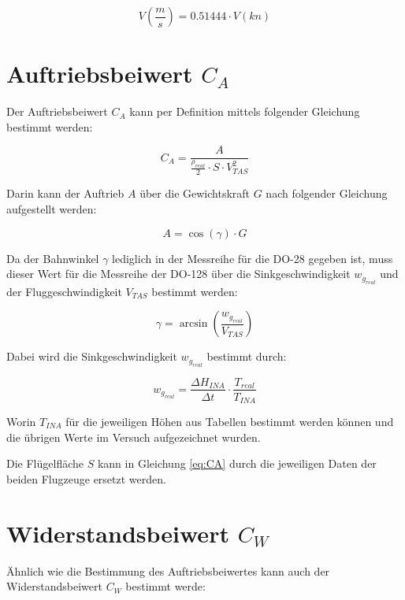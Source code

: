 \begin{equation}
V\left(\frac{m}{s}\right)=0.51444 \cdot V\left(kn\right)
\end{equation}


\section{Auftriebsbeiwert $C_A$}

Der Auftriebsbeiwert $C_A$ kann per Definition mittels folgender Gleichung bestimmt werden\cite{Skript}:

\begin{equation}
C_A=\frac{A}{\frac{\rho_{real}}{2} \cdot S \cdot V_{TAS}^2}
\label{eq:CA}
\end{equation}

Darin kann der Auftrieb $A$ über die Gewichtskraft $G$ nach folgender Gleichung aufgestellt werden:

\begin{equation}
A=\cos(\gamma) \cdot G
\label{eq:A}
\end{equation}

Da der Bahnwinkel $\gamma$ lediglich in der Messreihe für die DO-28 gegeben ist, muss dieser Wert für die Messreihe der DO-128 über die Sinkgeschwindigkeit $w_{g_{real}}$ und der Fluggeschwindigkeit $V_{TAS}$ bestimmt werden:

\begin{equation}
\gamma=\arcsin\left(\frac{w_{g_{real}}}{V_{TAS}}\right)
\label{eq:gamma}
\end{equation} 

Dabei wird die Sinkgeschwindigkeit $w_{g_{real}}$ bestimmt durch\cite{Kurzskript}:

\begin{equation}
w_{g_{real}}=\frac{\Delta H_{INA}}{\Delta t} \cdot \frac{T_{real}}{T_{INA}}
\end{equation}

Worin $T_{INA}$ für die jeweiligen Höhen aus Tabellen bestimmt werden können und die übrigen Werte im Versuch aufgezeichnet wurden.

Die Flügelfläche $S$ kann in Gleichung \ref{eq:CA} durch die jeweiligen Daten der beiden Flugzeuge ersetzt werden.

\section{Widerstandsbeiwert $C_W$}

Ähnlich wie die Bestimmung des Auftriebsbeiwertes kann auch der Widerstandsbeiwert $C_W$ bestimmt werde:

